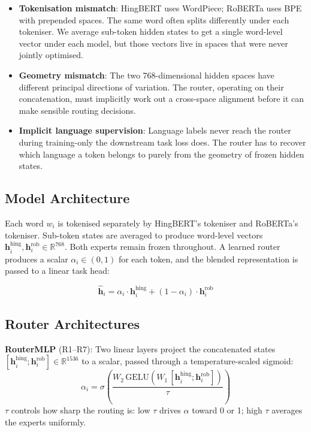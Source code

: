 \documentclass[conference]{IEEEtran}
\begin{document}
\begin{itemize}
  \item \textbf{Tokenisation mismatch}: HingBERT uses WordPiece; RoBERTa uses BPE with prepended spaces. The same word often splits differently under each tokeniser. We average sub-token hidden states to get a single word-level vector under each model, but those vectors live in spaces that were never jointly optimised.
  \item \textbf{Geometry mismatch}: The two 768-dimensional hidden spaces have different principal directions of variation. The router, operating on their concatenation, must implicitly work out a cross-space alignment before it can make sensible routing decisions.
  \item \textbf{Implicit language supervision}: Language labels never reach the router during training-only the downstream task loss does. The router has to recover which language a token belongs to purely from the geometry of frozen hidden states.
\end{itemize}

\subsection{Model Architecture}

Each word $w_i$ is tokenised separately by HingBERT's tokeniser and RoBERTa's tokeniser. Sub-token states are averaged to produce word-level vectors $\mathbf{h}^{\text{hing}}_i, \mathbf{h}^{\text{rob}}_i \in \mathbb{R}^{768}$. Both experts remain frozen throughout. A learned router produces a scalar $\alpha_i \in (0,1)$ for each token, and the blended representation is passed to a linear task head:

\begin{equation}
    \hat{\mathbf{h}}_i = \alpha_i \cdot \mathbf{h}^{\text{hing}}_i + (1 - \alpha_i) \cdot \mathbf{h}^{\text{rob}}_i
\end{equation}

\subsection{Router Architectures}

\textbf{RouterMLP} (R1--R7): Two linear layers project the concatenated states $[\mathbf{h}^{\text{hing}}_i; \mathbf{h}^{\text{rob}}_i] \in \mathbb{R}^{1536}$ to a scalar, passed through a temperature-scaled sigmoid:
\begin{equation}
    \alpha_i = \sigma\!\left(\frac{W_2\,\text{GELU}(W_1\,[\mathbf{h}^{\text{hing}}_i; \mathbf{h}^{\text{rob}}_i])}{\tau}\right)
\end{equation}
$\tau$ controls how sharp the routing is: low $\tau$ drives $\alpha$ toward 0 or 1; high $\tau$ averages the experts uniformly.
\end{document}
